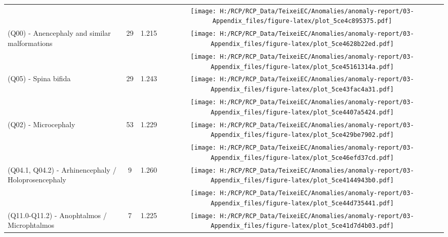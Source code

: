 \documentclass[
]{krantz}
\begin{document}
\begin{longtable}[t]{>{\raggedright\arraybackslash}m{4cm}cc>{}c}
\endfoot
\bottomrule
\endlastfoot
\cellcolor{gray!6}{Neural tube defects} & \cellcolor{gray!6}{64} & \cellcolor{gray!6}{1.226} & \cellcolor{gray!6}{}\texttt{[image: H:/RCP/RCP\_Data/TeixeiEC/Anomalies/anomaly-report/03-Appendix\_files/figure-latex/plot\_5ce4c895375.pdf]}\\
(Q00) - Anencephaly and similar malformations & 29 & 1.215 & \texttt{[image: H:/RCP/RCP\_Data/TeixeiEC/Anomalies/anomaly-report/03-Appendix\_files/figure-latex/plot\_5ce4628b22ed.pdf]}\\
\cellcolor{gray!6}{(Q01) - Encephalocele} & \cellcolor{gray!6}{6} & \cellcolor{gray!6}{1.204} & \cellcolor{gray!6}{}\texttt{[image: H:/RCP/RCP\_Data/TeixeiEC/Anomalies/anomaly-report/03-Appendix\_files/figure-latex/plot\_5ce45161314a.pdf]}\\
(Q05) - Spina bifida & 29 & 1.243 & \texttt{[image: H:/RCP/RCP\_Data/TeixeiEC/Anomalies/anomaly-report/03-Appendix\_files/figure-latex/plot\_5ce43fac4a31.pdf]}\\
\cellcolor{gray!6}{Selected central nervous system defects} & \cellcolor{gray!6}{108} & \cellcolor{gray!6}{1.228} & \cellcolor{gray!6}{}\texttt{[image: H:/RCP/RCP\_Data/TeixeiEC/Anomalies/anomaly-report/03-Appendix\_files/figure-latex/plot\_5ce4407a5424.pdf]}\\
\addlinespace
(Q02) - Microcephaly & 53 & 1.229 & \texttt{[image: H:/RCP/RCP\_Data/TeixeiEC/Anomalies/anomaly-report/03-Appendix\_files/figure-latex/plot\_5ce429be7902.pdf]}\\
\cellcolor{gray!6}{(Q03) - Congenital hydrocephalus} & \cellcolor{gray!6}{50} & \cellcolor{gray!6}{1.225} & \cellcolor{gray!6}{}\texttt{[image: H:/RCP/RCP\_Data/TeixeiEC/Anomalies/anomaly-report/03-Appendix\_files/figure-latex/plot\_5ce46efd37cd.pdf]}\\
(Q04.1, Q04.2) - Arhinencephaly / Holoprosencephaly & 9 & 1.260 & \texttt{[image: H:/RCP/RCP\_Data/TeixeiEC/Anomalies/anomaly-report/03-Appendix\_files/figure-latex/plot\_5ce4144943b0.pdf]}\\
\cellcolor{gray!6}{Selected sense organ defects} & \cellcolor{gray!6}{28} & \cellcolor{gray!6}{1.214} & \cellcolor{gray!6}{}\texttt{[image: H:/RCP/RCP\_Data/TeixeiEC/Anomalies/anomaly-report/03-Appendix\_files/figure-latex/plot\_5ce44d735441.pdf]}\\
(Q11.0-Q11.2) - Anophtalmos / Microphtalmos & 7 & 1.225 & \texttt{[image: H:/RCP/RCP\_Data/TeixeiEC/Anomalies/anomaly-report/03-Appendix\_files/figure-latex/plot\_5ce41d7d4b03.pdf]}\\

\end{longtable}
\end{document}
